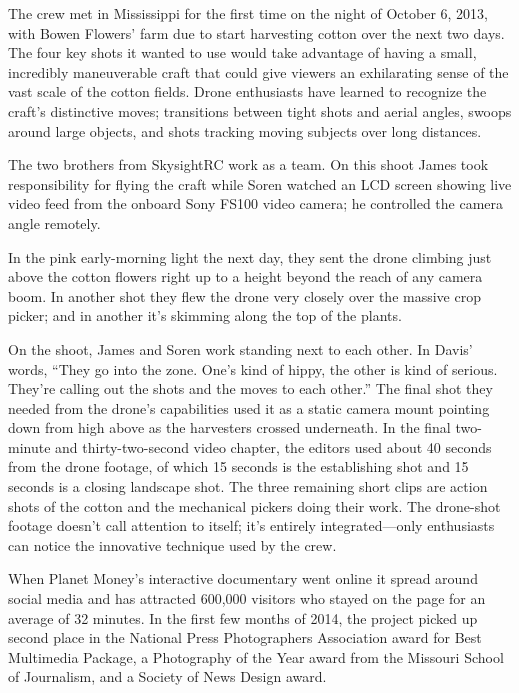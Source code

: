 The crew met in Mississippi for the first time on the night of October 6,
2013, with Bowen Flowers' farm due to start harvesting cotton over the next
two days. The four key shots it wanted to use would take advantage of having
a small, incredibly maneuverable craft that could give viewers an exhilarating
sense of the vast scale of the cotton fields. Drone enthusiasts have
learned to recognize the craft's distinctive moves; transitions between tight
shots and aerial angles, swoops around large objects, and shots tracking
moving subjects over long distances.

The two brothers from SkysightRC work as a team. On this shoot James
took responsibility for flying the craft while Soren watched an LCD screen
showing live video feed from the onboard Sony FS100 video camera; he
controlled the camera angle remotely.

In the pink early-morning light the next day, they sent the drone climbing
just above the cotton flowers right up to a height beyond the reach of
any camera boom. In another shot they flew the drone very closely over
the massive crop picker; and in another it's skimming along the top of
the plants.

On the shoot, James and Soren work standing next to each other. In Davis'
words, ``They go into the zone. One's kind of hippy, the other is kind of serious.
They're calling out the shots and the moves to each other.'' The final shot
they needed from the drone's capabilities used it as a static camera mount
pointing down from high above as the harvesters crossed underneath.
In the final two-minute and thirty-two-second video chapter, the editors
used about 40 seconds from the drone footage, of which 15 seconds is the
establishing shot and 15 seconds is a closing landscape shot. The three
remaining short clips are action shots of the cotton and the mechanical
pickers doing their work. The drone-shot footage doesn't call attention to
itself; it's entirely integrated—only enthusiasts can notice the innovative
technique used by the crew.

When Planet Money's interactive documentary went online it spread around
social media and has attracted 600,000 visitors who stayed on the page for
an average of 32 minutes. In the first few months of 2014, the project picked
up second place in the National Press Photographers Association award for
Best Multimedia Package, a Photography of the Year award from the Missouri
School of Journalism, and a Society of News Design award.

